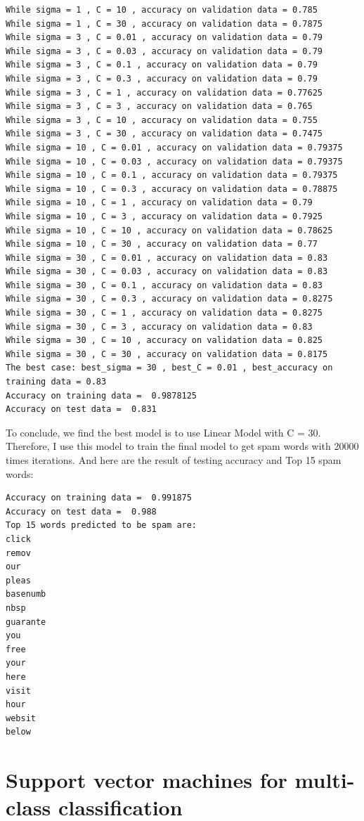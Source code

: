 \documentclass[paper=a4, fontsize=11pt]{scrartcl} %
\numberwithin{equation}{section} %
\numberwithin{figure}{section} %
\numberwithin{table}{section} %
\begin{document}
\begin{verbatim}
While sigma = 1 , C = 10 , accuracy on validation data = 0.785
While sigma = 1 , C = 30 , accuracy on validation data = 0.7875
While sigma = 3 , C = 0.01 , accuracy on validation data = 0.79
While sigma = 3 , C = 0.03 , accuracy on validation data = 0.79
While sigma = 3 , C = 0.1 , accuracy on validation data = 0.79
While sigma = 3 , C = 0.3 , accuracy on validation data = 0.79
While sigma = 3 , C = 1 , accuracy on validation data = 0.77625
While sigma = 3 , C = 3 , accuracy on validation data = 0.765
While sigma = 3 , C = 10 , accuracy on validation data = 0.755
While sigma = 3 , C = 30 , accuracy on validation data = 0.7475
While sigma = 10 , C = 0.01 , accuracy on validation data = 0.79375
While sigma = 10 , C = 0.03 , accuracy on validation data = 0.79375
While sigma = 10 , C = 0.1 , accuracy on validation data = 0.79375
While sigma = 10 , C = 0.3 , accuracy on validation data = 0.78875
While sigma = 10 , C = 1 , accuracy on validation data = 0.79
While sigma = 10 , C = 3 , accuracy on validation data = 0.7925
While sigma = 10 , C = 10 , accuracy on validation data = 0.78625
While sigma = 10 , C = 30 , accuracy on validation data = 0.77
While sigma = 30 , C = 0.01 , accuracy on validation data = 0.83
While sigma = 30 , C = 0.03 , accuracy on validation data = 0.83
While sigma = 30 , C = 0.1 , accuracy on validation data = 0.83
While sigma = 30 , C = 0.3 , accuracy on validation data = 0.8275
While sigma = 30 , C = 1 , accuracy on validation data = 0.8275
While sigma = 30 , C = 3 , accuracy on validation data = 0.83
While sigma = 30 , C = 10 , accuracy on validation data = 0.825
While sigma = 30 , C = 30 , accuracy on validation data = 0.8175
The best case: best_sigma = 30 , best_C = 0.01 , best_accuracy on training data = 0.83
Accuracy on training data =  0.9878125
Accuracy on test data =  0.831
\end{verbatim}
To conclude, we find the best model is to use Linear Model with C = 30. Therefore, I use this model to train the final model to get spam words with 20000 times iterations. And here are the result of testing accuracy and Top 15 spam words:
\begin{verbatim}
Accuracy on training data =  0.991875
Accuracy on test data =  0.988
Top 15 words predicted to be spam are:
click
remov
our
pleas
basenumb
nbsp
guarante
you
free
your
here
visit
hour
websit
below
\end{verbatim}


\section{Support vector machines for multi-class classification}
\end{document}
